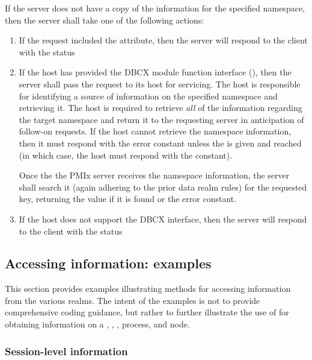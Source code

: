 If the server does not have a copy of the information for the specified
namespace, then the server shall take one of the following actions:
\begin{enumerate}
    \item If the request included the  attribute, then
    the server will respond to the client with the
     status

    \item If the host has provided the \ac{DBCX} module function interface
    (), then the server shall pass the
    request to its host for servicing. The host is responsible for identifying
    a source of information on the specified namespace and retrieving it. The
    host is required to retrieve \emph{all} of the information regarding the target namespace
    and return it to the requesting server in anticipation of follow-on
    requests. If the host cannot retrieve the
    namespace information, then it must respond with the  error constant unless the  is given and reached (in which case, the host must respond with the  constant).

    Once the the \ac{PMIx} server receives the namespace information, the server shall search it (again adhering to the prior data realm rules) for the requested key, returning the value if it is found or the  error constant.

    \item If the host does not support the \ac{DBCX} interface, then the
    server will respond to the client with the 
    status
\end{enumerate}

\subsection{Accessing information: examples}
\label{chap:api_kv:getex}

This section provides examples illustrating methods for accessing information from the various realms. The intent of the examples is not to provide comprehensive coding guidance, but rather to further illustrate the use of  for obtaining information on a , , , process, and node.

\subsubsection{Session-level information}

